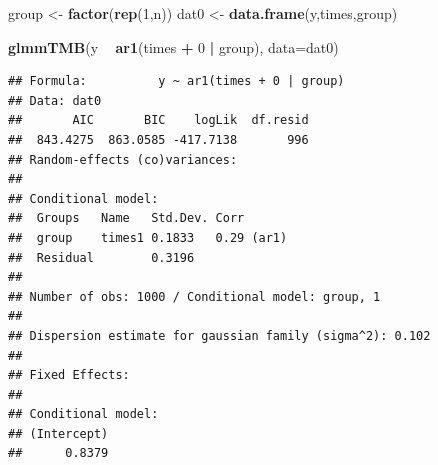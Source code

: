 \documentclass[]{book}
\newenvironment{Shaded}{\begin{snugshade}}{\end{snugshade}}
\newcommand{\KeywordTok}[1]{\textcolor[rgb]{0.13,0.29,0.53}{\textbf{#1}}}
\newcommand{\DataTypeTok}[1]{\textcolor[rgb]{0.13,0.29,0.53}{#1}}
\newcommand{\DecValTok}[1]{\textcolor[rgb]{0.00,0.00,0.81}{#1}}
\newcommand{\StringTok}[1]{\textcolor[rgb]{0.31,0.60,0.02}{#1}}
\newcommand{\OperatorTok}[1]{\textcolor[rgb]{0.81,0.36,0.00}{\textbf{#1}}}
\newcommand{\NormalTok}[1]{#1}
\begin{document}
\begin{Shaded}
\begin{Highlighting}[]
\NormalTok{group <-}\StringTok{ }\KeywordTok{factor}\NormalTok{(}\KeywordTok{rep}\NormalTok{(}\DecValTok{1}\NormalTok{,n))}
\NormalTok{dat0 <-}\StringTok{ }\KeywordTok{data.frame}\NormalTok{(y,times,group)}

\KeywordTok{glmmTMB}\NormalTok{(y }\OperatorTok{~}\StringTok{ }\KeywordTok{ar1}\NormalTok{(times }\OperatorTok{+}\StringTok{ }\DecValTok{0} \OperatorTok{|}\StringTok{ }\NormalTok{group), }\DataTypeTok{data=}\NormalTok{dat0)}
\end{Highlighting}
\end{Shaded}

\begin{verbatim}
## Formula:          y ~ ar1(times + 0 | group)
## Data: dat0
##       AIC       BIC    logLik  df.resid 
##  843.4275  863.0585 -417.7138       996 
## Random-effects (co)variances:
## 
## Conditional model:
##  Groups   Name   Std.Dev. Corr      
##  group    times1 0.1833   0.29 (ar1)
##  Residual        0.3196             
## 
## Number of obs: 1000 / Conditional model: group, 1
## 
## Dispersion estimate for gaussian family (sigma^2): 0.102 
## 
## Fixed Effects:
## 
## Conditional model:
## (Intercept)  
##      0.8379
\end{verbatim}


\end{document}
